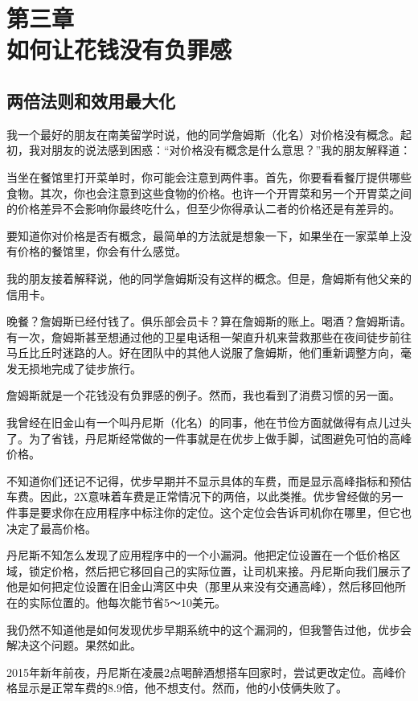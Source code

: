 \section[第三章\q 如何让花钱没有负罪感]{第三章\\ 如何让花钱没有负罪感}
\renewcommand{\bookchapter}{3}
\setcounter{figure}{0}
\setcounter{table}{0}
\subsection{两倍法则和效用最大化}
我一个最好的朋友在南美留学时说，他的同学詹姆斯（化名）对价格没有概念。起初，我对朋友的说法感到困惑：“对价格没有概念是什么意思？”我的朋友解释道：

当坐在餐馆里打开菜单时，你可能会注意到两件事。首先，你要看看餐厅提供哪些食物。其次，你也会注意到这些食物的价格。也许一个开胃菜和另一个开胃菜之间的价格差异不会影响你最终吃什么，但至少你得承认二者的价格还是有差异的。

要知道你对价格是否有概念，最简单的方法就是想象一下，如果坐在一家菜单上没有价格的餐馆里，你会有什么感觉。

我的朋友接着解释说，他的同学詹姆斯没有这样的概念。但是，詹姆斯有他父亲的信用卡。

晚餐？詹姆斯已经付钱了。俱乐部会员卡？算在詹姆斯的账上。喝酒？詹姆斯请。有一次，詹姆斯甚至想通过他的卫星电话租一架直升机来营救那些在夜间徒步前往马丘比丘时迷路的人。好在团队中的其他人说服了詹姆斯，他们重新调整方向，毫发无损地完成了徒步旅行。

詹姆斯就是一个花钱没有负罪感的例子。然而，我也看到了消费习惯的另一面。

我曾经在旧金山有一个叫丹尼斯（化名）的同事，他在节俭方面就做得有点儿过头了。为了省钱，丹尼斯经常做的一件事就是在优步上做手脚，试图避免可怕的高峰价格。

不知道你们还记不记得，优步早期并不显示具体的车费，而是显示高峰指标和预估车费。因此，2X意味着车费是正常情况下的两倍，以此类推。优步曾经做的另一件事是要求你在应用程序中标注你的定位。这个定位会告诉司机你在哪里，但它也决定了最高价格。

丹尼斯不知怎么发现了应用程序中的一个小漏洞。他把定位设置在一个低价格区域，锁定价格，然后把它移回自己的实际位置，让司机来接。丹尼斯向我们展示了他是如何把定位设置在旧金山湾区中央（那里从来没有交通高峰），然后移回他所在的实际位置的。他每次能节省5～10美元。

我仍然不知道他是如何发现优步早期系统中的这个漏洞的，但我警告过他，优步会解决这个问题。果然如此。

2015年新年前夜，丹尼斯在凌晨2点喝醉酒想搭车回家时，尝试更改定位。高峰价格显示是正常车费的8.9倍，他不想支付。然而，他的小伎俩失败了。

